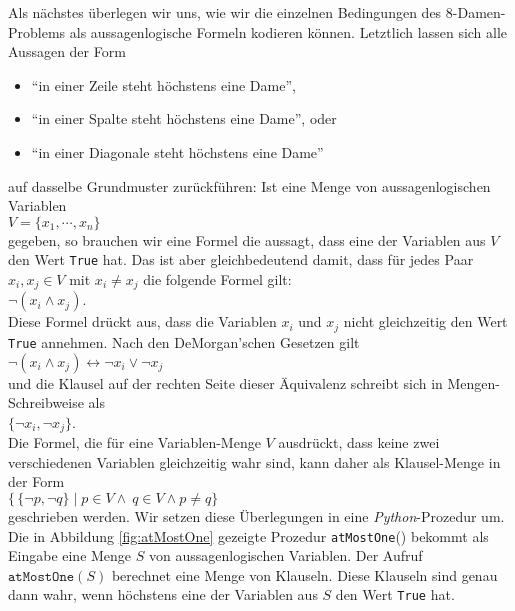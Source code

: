Als nächstes überlegen wir uns, wie wir die einzelnen Bedingungen des 8-Damen-Problems 
als aussagenlogische
Formeln kodieren können.  Letztlich lassen sich alle Aussagen der Form
\begin{itemize}
\item ``in einer Zeile steht höchstens eine Dame'', 
\item ``in einer Spalte steht höchstens eine Dame'', oder 
\item ``in einer Diagonale steht höchstens eine Dame'' 
\end{itemize}
auf dasselbe Grundmuster zurückführen:
Ist eine Menge von aussagenlogischen Variablen \\[0.2cm]
\hspace*{1.3cm} $V = \{ x_1, \cdots, x_n \}$ \\[0.2cm]
gegeben, so brauchen wir eine Formel die aussagt, dass  eine der Variablen aus
$V$ den Wert \texttt{True} hat.  Das ist aber gleichbedeutend damit, dass für jedes Paar
$x_i, x_j \in V$ mit $x_i \not= x_j$ die folgende Formel gilt: \\[0.2cm]
\hspace*{1.3cm} $\neg (x_i \wedge x_j)$. \\[0.2cm]
Diese Formel drückt aus, dass die Variablen $x_i$ und $x_j$ nicht gleichzeitig den Wert
\texttt{True} annehmen.  Nach den De\-Morgan'schen Gesetzen gilt
\\[0.2cm]
\hspace*{1.3cm}
$\neg (x_i \wedge x_j) \leftrightarrow \neg x_i \vee \neg x_j$
\\[0.2cm]
und die Klausel auf der rechten Seite dieser Äquivalenz schreibt sich in Mengen-Schreibweise als
\\[0.2cm]
\hspace*{1.3cm}  $\{\neg x_i, \neg x_j \}$. \\[0.2cm]
Die Formel, die für eine Variablen-Menge $V$ ausdrückt, dass keine zwei verschiedenen
Variablen gleichzeitig wahr sind, kann daher als Klausel-Menge in der Form
\\[0.2cm]
\hspace*{1.3cm}
$\bigl\{\, \{ \neg p, \neg q \} \;|\; p \in V \wedge\ q \in V \wedge p \not= q \bigr\}$
\\[0.2cm]
geschrieben werden.
Wir setzen diese Überlegungen in eine \textsl{Python}-Prozedur um.  Die in Abbildung \ref{fig:atMostOne}
gezeigte Prozedur \texttt{atMostOne}() bekommt als Eingabe eine Menge $S$ von
aussagenlogischen Variablen.  Der Aufruf $\texttt{atMostOne}(S)$ berechnet eine Menge von
Klauseln.  Diese Klauseln sind genau dann wahr, wenn höchstens eine der Variablen aus $S$
den Wert \texttt{True} hat.


